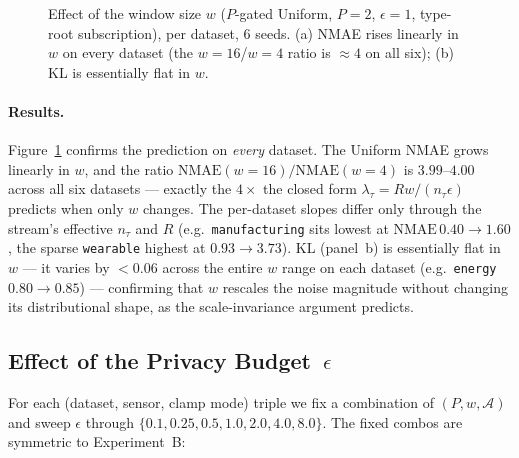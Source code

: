 \begin{figure}[t]
\begin{subfigure}{0.49\linewidth}
\end{subfigure}
\caption{Effect of the window size $w$ ($P$-gated Uniform, $P=2$, $\epsilon=1$, type-root subscription), per dataset, 6 seeds. (a) NMAE rises linearly in $w$ on every dataset (the $w{=}16$/$w{=}4$ ratio is $\approx\!4$ on all six); (b) KL is essentially flat in $w$.}\label{fig:exp-w}
\end{figure}

\paragraph{Results.} Figure~\ref{fig:exp-w} confirms the prediction on \emph{every} dataset. The Uniform NMAE grows linearly in $w$, and the ratio $\mathrm{NMAE}(w{=}16)/\mathrm{NMAE}(w{=}4)$ is $3.99$--$4.00$ across all six datasets --- exactly the $4\times$ the closed form $\lambda_\tau = Rw/(n_\tau\epsilon)$ predicts when only $w$ changes. The per-dataset slopes differ only through the stream's effective $n_\tau$ and $R$ (e.g.\ \texttt{manufacturing} sits lowest at $\mathrm{NMAE}\,0.40\!\to\!1.60$, the sparse \texttt{wearable} highest at $0.93\!\to\!3.73$). KL (panel~b) is essentially flat in $w$ --- it varies by $<\!0.06$ across the entire $w$ range on each dataset (e.g.\ \texttt{energy} $0.80\!\to\!0.85$) --- confirming that $w$ rescales the noise magnitude without changing its distributional shape, as the scale-invariance argument predicts.

\subsection{Effect of the Privacy Budget~$\epsilon$}
\label{sec:exp-C}


For each (dataset, sensor, clamp mode) triple we fix a combination of $(P, w, \mathcal{A})$ and sweep $\epsilon$ through $\{0.1, 0.25, 0.5, 1.0, 2.0, 4.0, 8.0\}$. The fixed combos are symmetric to Experiment~B:

